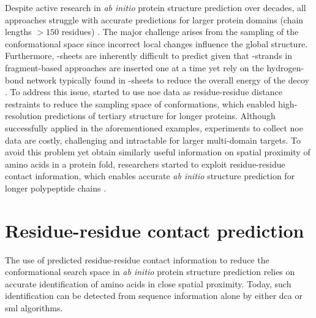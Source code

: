 Despite active research in \textit{ab initio} protein structure prediction over decades, all approaches struggle with accurate predictions for larger protein domains (chain lengths $>150$ residues) \cite{Bradley2005-lw,Tai2014-rz,He2013-gm,Kinch2011-py}. The major challenge arises from the sampling of the conformational space since incorrect local changes influence the global structure. Furthermore, \textbeta-sheets are inherently difficult to predict given that \textbeta-strands in fragment-based approaches are inserted one at a time yet rely on the hydrogen-bond network typically found in \textbeta-sheets to reduce the overall energy of the decoy \cite{Rohl2004-dj}. To address this issue, \textcite{Lange2012-yh,Raman2010-xv,Gobl2014-gc} started to use \gls{noe} data as residue-residue distance restraints to reduce the sampling space of conformations, which enabled high-resolution predictions of tertiary structure for longer proteins. Although successfully applied in the aforementioned examples, experiments to collect \gls{noe} data are costly, challenging and intractable for larger multi-domain targets. To avoid this problem yet obtain similarly useful information on spatial proximity of amino acids in a protein fold, researchers started to exploit residue-residue contact information, which enables accurate \textit{ab initio} structure prediction for longer polypeptide chains \cite[e.g.,][]{Marks2011-os,Michel2014-eg,Kosciolek2014-bt,Ovchinnikov2015-tn,Ovchinnikov2016-jj,Michel2017-xh,De_Oliveira2018-sg,Ovchinnikov2017-nd,Wang2017-rx}.

\section{Residue-residue contact prediction} \label{sec:introduction_contact_prediction}
The use of predicted residue-residue contact information to reduce the conformational search space in \textit{ab initio} protein structure prediction relies on accurate identification of amino acids in close spatial proximity. Today, such identification can be detected from sequence information alone by either \gls{dca} or \gls{sml} algorithms.

